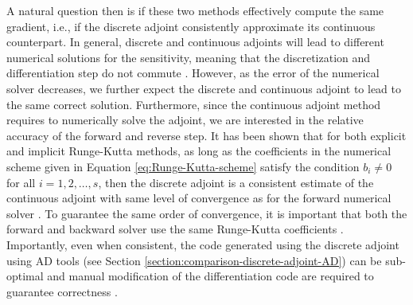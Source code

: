 A natural question then is if these two methods effectively compute the same gradient, i.e., if the discrete adjoint consistently approximate its continuous counterpart. 
In general, discrete and continuous adjoints will lead to different numerical solutions for the sensitivity, meaning that the discretization and differentiation step do not commute \cite{Jensen_Nakshatrala_Tortorelli_2014, Gunzburger_2002, nadarajah2000comparison}.
However, as the error of the numerical solver decreases, we further expect the discrete and continuous adjoint to lead to the same correct solution. 
Furthermore, since the continuous adjoint method requires to numerically solve the adjoint, we are interested in the relative accuracy of the forward and reverse step. 
It has been shown that for both explicit and implicit Runge-Kutta methods, as long as the coefficients in the numerical scheme given in Equation \eqref{eq:Runge-Kutta-scheme} satisfy the condition $b_i \neq 0$ for all $i=1,2, \ldots, s$, then the discrete adjoint is a consistent estimate of the continuous adjoint with same level of convergence as for the forward numerical solver \cite{Hager_2000,Walther_2007, sandu2006properties, sandu2011solution}.
To guarantee the same order of convergence, it is important that both the forward and backward solver use the same Runge-Kutta coefficients \cite{Alexe_Sandu_2009}.
Importantly, even when consistent, the code generated using the discrete adjoint using AD tools (see Section \ref{section:comparison-discrete-adjoint-AD}) can be sub-optimal and manual modification of the differentiation code are required to guarantee correctness \cite{Eberhard_Bischof_1996, alexe2007denserks}.




